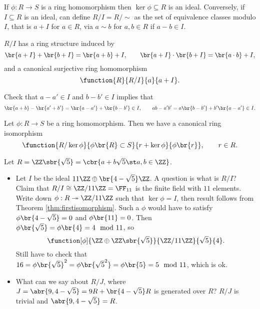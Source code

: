 \begin{fact*}
If $ \phi : R \to S $ is a ring homomorphism then $ \ker \phi \subseteq R $ is an ideal. Conversely, if $ I \subseteq R $ is an ideal, can define $ R / I = R / \sim $ as the set of equivalence classes modulo $ I $, that is $ a + I $ for $ a \in R $, via $ a \sim b $ for $ a, b \in R $ if $ a - b \in I $.
\end{fact*}

\begin{proposition}
$ R / I $ has a ring structure induced by
$$ \br{a + I} + \br{b + I} = \br{a + b} + I, \qquad \br{a + I} \cdot \br{b + I} = \br{a \cdot b} + I, $$
and a canonical surjective ring homomorphism
$$ \function{R}{R / I}{a}{a + I}. $$
\end{proposition}

Check that $ a - a' \in I $ and $ b - b' \in I $ implies that
$$ \br{a + b} - \br{a' + b'} = \br{a - a'} + \br{b - b'} \in I, \qquad ab - a'b' = a\br{b - b'} + b'\br{a - a'} \in I. $$

\begin{theorem}
\label{thm:firstisomorphism}
Let $ \phi : R \to S $ be a ring homomorphism. Then we have a canonical ring isomorphism
$$ \function{R / \ker \phi}{\phi\br{R} \subset S}{r + \ker \phi}{\phi\br{r}}, \qquad r \in R. $$
\end{theorem}

\begin{example*}
Let $ R = \ZZ\sbr{\sqrt{5}} = \cbr{a + b\sqrt{5} \st a, b \in \ZZ} $.
\begin{itemize}
\item Let $ I $ be the ideal $ 11\ZZ \oplus \br{4 - \sqrt{5}}\ZZ $. A question is what is $ R / I $? Claim that $ R / I \cong \ZZ / 11\ZZ = \FF_{11} $ is the finite field with $ 11 $ elements. Write down $ \phi : R \twoheadrightarrow \ZZ / 11\ZZ $ such that $ \ker \phi = I $, then result follows from Theorem \ref{thm:firstisomorphism}. Such a $ \phi $ would have to satisfy $ \phi\br{4 - \sqrt{5}} = 0 $ and $ \phi\br{11} = 0 $. Then $ \phi\br{\sqrt{5}} = \phi\br{4} = 4 \mod 11 $, so
$$ \function[\phi]{\ZZ \oplus \ZZ\sbr{\sqrt{5}}}{\ZZ / 11\ZZ}{\sqrt{5}}{4}. $$
Still have to check that $ 16 = \phi\br{\sqrt{5}}^2 = \phi\br{\sqrt{5}^2} = \phi\br{5} = 5 \mod 11 $, which is ok.
\item What can we say about $ R / J $, where $ J = \abr{9, 4 - \sqrt{5}} = 9R + \br{4 - \sqrt{5}}R $ is generated over $ R $? $ R / J $ is trivial and $ \abr{9, 4 - \sqrt{5}} = R $.
\end{itemize}
\end{example*}

